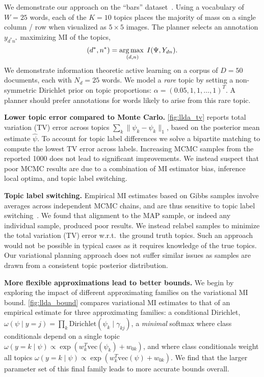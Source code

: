 We demonstrate our approach on the ``bars''
dataset~\citep{griffiths2004finding}.  Using a vocabulary of $W=25$
words, each of the $K=10$ topics places the majority of mass on a
single column / row when visualized as $5\times 5$ images. The planner
selects an annotation $y_{d^*n^*}$ maximizing MI of the
topics,
\begin{equation}
  (d^*,n^*) = \operatorname*{arg\,max\;}_{(d,n)} I(\Psi, Y_{dn}).
\end{equation}
We demonstrate information theoretic active learning on a corpus of
$D=50$ documents, each with $N_d=25$ words.  We model a \emph{rare}
topic by setting a non-symmetric Dirichlet prior on topic proportions:
$\alpha = (0.05, 1, 1, \ldots, 1)^T$.  A planner should prefer
annotations for words likely to arise from this rare topic.

\textbf{Lower topic error compared to Monte Carlo.}
\FIG\ref{fig:llda_tv} reports total variation (TV) error across topics
$\sum_k \|\psi_k - \hat{\psi}_k\|_1$, based on the posterior mean
estimate $\hat{\psi}$.  To account for topic label differences we
solve a bipartite matching to compute the lowest TV error across
labels.  Increasing MCMC samples from the reported 1000 does not lead
to significant improvements.  We instead suspect that poor MCMC
results are due to a combination of MI estimator bias, inference local
optima, and topic label switching.

\textbf{Topic label switching.}
Empirical MI estimates based on Gibbs samples involve averages across
independent MCMC chains, and are thus sensitive to topic label
switching~\citep{stephens2000dealing}.  We found that alignment to the
MAP sample, or indeed any individual sample, produced poor results.
We instead relabel samples to minimize the total variation (TV) error
w.r.t.~the ground truth topics.  Such an approach would not be
possible in typical cases as it requires knowledge of the true topics.
Our variational planning approach does not suffer similar issues as
samples are drawn from a consistent topic posterior distribution.

\textbf{More flexible approximations lead to better bounds.}
We begin by exploring the impact of different approximating families
on the variational MI bound.  \FIG\ref{fig:llda_bound} compares
variational MI estimates to that of an empirical estimate for three
approximating families: a conditional Dirichlet, $\omega(\psi \mid
y=j) = \prod_k \text{Dirichlet}(\psi_k \mid \gamma_{kj})$,
a \emph{minimal} softmax where class conditionals depend on a single
topic $\omega(y = k \mid \psi) \propto \exp( w_k^T \text{vec}(\psi_k)
+ w_{0k} )$, and where class conditionals weight all topics
$\omega(y = k \mid \psi) \propto \exp( w_k^T \text{vec}(\psi) + w_{0k}
)$.  We find that the larger parameter set of this final family leads
to more accurate bounds overall.


